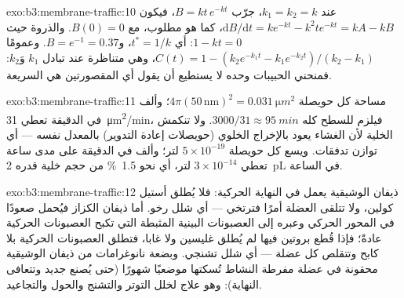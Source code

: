 \begin{solution}{exo:b3:membrane-traffic:10}
عند $k_{1} = k_{2} = k$، جرّب $B = kt\,e^{-kt}$، فيكون $\mathrm{d}B/\mathrm{d}t
= k e^{-kt} - k^{2}t e^{-kt} = kA - kB$، كما هو مطلوب، مع $B(0) = 0$.
والذروة حيث $1 - kt = 0$: أي $t^{*} = 1/k$، و$B = e^{-1} = 0.37$. وعمومًا
$C(t) = 1 - (k_{2}e^{-k_{1}t} - k_{1}e^{-k_{2}t})/(k_{2} - k_{1})$،
وهي متناظرة عند تبادل $k_{1}$ وَ$k_{2}$: فمنحني الحبيبات
وحده لا يستطيع أن يقول أي المقصورتين هي السريعة.
\end{solution}

\begin{solution}{exo:b3:membrane-traffic:11}
مساحة كل حويصلة $4\pi(50\,\text{nm})^{2} = \qty{0.031}{\micro
m^2}$؛ وألف في الدقيقة تعطي \qty{31}{\micro m^2/min}، فيلزم للسطح
كله $3000/31 \approx \qty{95}{min}$. ولا تنكمش الخلية
لأن الغشاء يعود بالإخراج الخلوي (حويصلات إعادة التدوير) بالمعدل
نفسه --- أي توازن تدفقات. ويسع كل حويصلة $5\times 10^{-19}$ لتر؛ وألف
في الدقيقة على مدى ساعة تعطي $3\times 10^{-14}$ لتر، أي نحو
\qty{1.5}{\%} من حجم خلية قدره \qty{2}{pL} في الساعة.
\end{solution}

\begin{solution}{exo:b3:membrane-traffic:12}
ذيفان الوشيقية يعمل في النهاية الحركية: فلا يُطلق أستيل كولين،
ولا تتلقى العضلة أمرًا فترتخي --- أي شلل
رخو. أما ذيفان الكزاز فيُحمل صعودًا في المحور الحركي وعبره إلى
العصبونات البينية المثبطة التي تكبح العصبونات الحركية عادةً؛ فإذا
قُطع بروتين  فيها لم يُطلق غليسين ولا غابا، فتطلق العصبونات الحركية
بلا كابح وتتقلص كل عضلة --- أي شلل تشنجي. وبضعة
نانوغرامات من ذيفان الوشيقية محقونة في عضلة مفرطة النشاط
تُسكتها موضعيًا شهورًا (حتى يُصنع  جديد وتتعافى النهاية):
وهو علاج لخلل التوتر والتشنج والحول والتجاعيد.
\end{solution}

